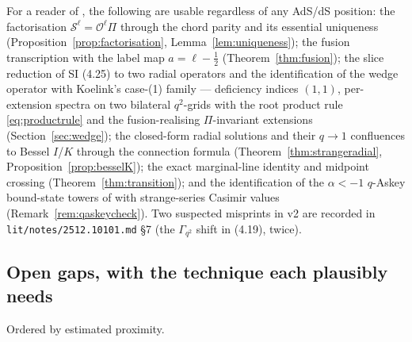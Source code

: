 \documentclass[11pt,a4paper]{article}
\theoremstyle{definition}
\theoremstyle{plain}
\renewcommand{\O}{\mathcal{O}}                  %
\begin{document}
For a reader of \cite{Schouten:2025dssyk}, the following are usable regardless of any
AdS/dS position: the factorisation $\mathcal{S}^{\ell}=\O^{\ell}\Pi$ through the chord
parity and its essential uniqueness (Proposition~\ref{prop:factorisation},
Lemma~\ref{lem:uniqueness}); the fusion transcription with the label map $a=\ell-\tfrac12$
(Theorem~\ref{thm:fusion}); the slice reduction of SI (4.25) to two radial operators and
the identification of the wedge operator with Koelink's case-(1) family --- deficiency
indices $(1,1)$, per-extension spectra on two bilateral $q^{2}$-grids with the root
product rule \eqref{eq:productrule} and the fusion-realising $\Pi$-invariant extensions
(Section~\ref{sec:wedge}); the closed-form radial solutions and their $q\to1$ confluences
to Bessel $I$/$K$ through the connection formula (Theorem~\ref{thm:strangeradial},
Proposition~\ref{prop:besselK}); the exact marginal-line identity and midpoint crossing
(Theorem~\ref{thm:transition}); and the identification of the $\alpha<-1$ $q$-Askey
bound-state towers of \cite{Aguilar:2026qaskey} with strange-series Casimir values
(Remark~\ref{rem:qaskeycheck}). Two suspected misprints in
\cite{Schouten:2025dssyk} v2 are recorded in \texttt{lit/notes/2512.10101.md} \S7 (the
$\Gamma_{q^{2}}$ shift in (4.19), twice).

\subsection{Open gaps, with the technique each plausibly needs}

Ordered by estimated proximity.
\end{document}
